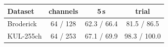 \begin{tabular}{lccc}\toprule
Dataset & channels & 5\,s & trial \\\midrule
Broderick & 64 / 128 & 62.3 / 66.4 & 81.5 / 86.5 \\
KUL-255ch & 64 / 253 & 67.1 / 69.9 & 98.3 / 100.0 \\
\bottomrule\end{tabular}
